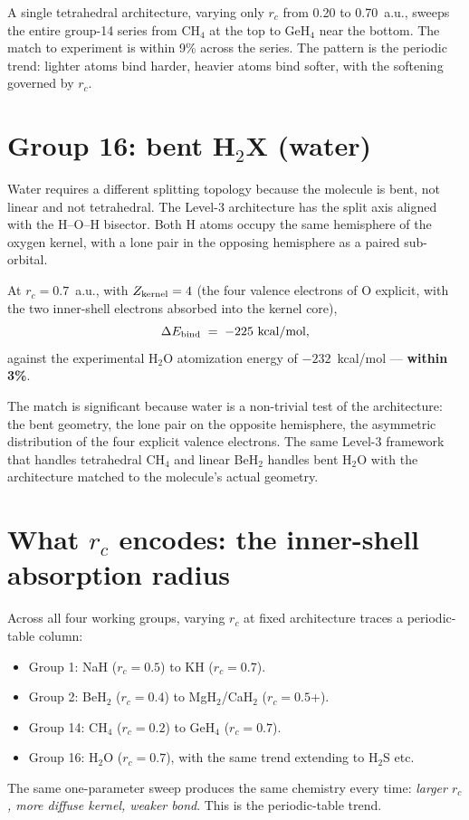 A single tetrahedral architecture, varying only $r_c$ from 0.20 to 0.70~a.u., sweeps the entire group-14 series from CH$_4$ at the top to GeH$_4$ near the bottom. The match to experiment is within 9\% across the series. The pattern is the periodic trend: lighter atoms bind harder, heavier atoms bind softer, with the softening governed by $r_c$.

\section{Group 16: bent H$_2$X (water)}\label{sec:group16}

Water requires a different splitting topology because the molecule is bent, not linear and not tetrahedral. The Level-3 architecture has the split axis aligned with the H--O--H bisector. Both H atoms occupy the same hemisphere of the oxygen kernel, with a lone pair in the opposing hemisphere as a paired sub-orbital.

At $r_c = 0.7$~a.u., with $Z_{\rm kernel} = 4$ (the four valence electrons of O explicit, with the two inner-shell electrons absorbed into the kernel core),
\[
\Delta E_{\rm bind} \;=\; -225 \text{ kcal/mol},
\]
against the experimental H$_2$O atomization energy of $-232$~kcal/mol --- \textbf{within 3\%}.

The match is significant because water is a non-trivial test of the architecture: the bent geometry, the lone pair on the opposite hemisphere, the asymmetric distribution of the four explicit valence electrons. The same Level-3 framework that handles tetrahedral CH$_4$ and linear BeH$_2$ handles bent H$_2$O with the architecture matched to the molecule's actual geometry.

\section{What $r_c$ encodes: the inner-shell absorption radius}\label{sec:rc-meaning}

Across all four working groups, varying $r_c$ at fixed architecture traces a periodic-table column:
\begin{itemize}
\item Group 1: NaH ($r_c = 0.5$) to KH ($r_c = 0.7$).
\item Group 2: BeH$_2$ ($r_c = 0.4$) to MgH$_2$/CaH$_2$ ($r_c = 0.5$+).
\item Group 14: CH$_4$ ($r_c = 0.2$) to GeH$_4$ ($r_c = 0.7$).
\item Group 16: H$_2$O ($r_c = 0.7$), with the same trend extending to H$_2$S etc.
\end{itemize}
The same one-parameter sweep produces the same chemistry every time: \emph{larger $r_c$, more diffuse kernel, weaker bond}. This is the periodic-table trend.

